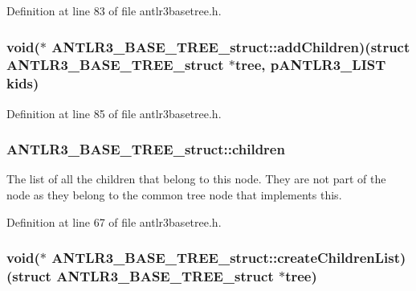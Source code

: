 Definition at line 83 of file antlr3basetree.\-h.

\hypertarget{struct_a_n_t_l_r3___b_a_s_e___t_r_e_e__struct_a6dd0ae2aa94691566e5c2a5fcc30deab}{
\subsubsection[{add\-Children}]{\setlength{\rightskip}{0pt plus 5cm}void($\ast$ A\-N\-T\-L\-R3\-\_\-\-B\-A\-S\-E\-\_\-\-T\-R\-E\-E\-\_\-struct\-::add\-Children)(struct {\bf A\-N\-T\-L\-R3\-\_\-\-B\-A\-S\-E\-\_\-\-T\-R\-E\-E\-\_\-struct} $\ast$tree, {\bf p\-A\-N\-T\-L\-R3\-\_\-\-L\-I\-S\-T} kids)}}\label{struct_a_n_t_l_r3___b_a_s_e___t_r_e_e__struct_a6dd0ae2aa94691566e5c2a5fcc30deab}


Definition at line 85 of file antlr3basetree.\-h.

\hypertarget{struct_a_n_t_l_r3___b_a_s_e___t_r_e_e__struct_a323bddeaa8cb3a8bb98423f9b2b5a013}{
\subsubsection[{children}]{ A\-N\-T\-L\-R3\-\_\-\-B\-A\-S\-E\-\_\-\-T\-R\-E\-E\-\_\-struct\-::children}}\label{struct_a_n_t_l_r3___b_a_s_e___t_r_e_e__struct_a323bddeaa8cb3a8bb98423f9b2b5a013}
The list of all the children that belong to this node. They are not part of the node as they belong to the common tree node that implements this. 

Definition at line 67 of file antlr3basetree.\-h.

\hypertarget{struct_a_n_t_l_r3___b_a_s_e___t_r_e_e__struct_a1f91471ff08c7024354d1af5f024df8c}{
\subsubsection[{create\-Children\-List}]{\setlength{\rightskip}{0pt plus 5cm}void($\ast$ A\-N\-T\-L\-R3\-\_\-\-B\-A\-S\-E\-\_\-\-T\-R\-E\-E\-\_\-struct\-::create\-Children\-List)(struct {\bf A\-N\-T\-L\-R3\-\_\-\-B\-A\-S\-E\-\_\-\-T\-R\-E\-E\-\_\-struct} $\ast$tree)}}\label{struct_a_n_t_l_r3___b_a_s_e___t_r_e_e__struct_a1f91471ff08c7024354d1af5f024df8c}


